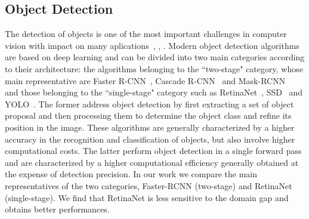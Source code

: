 \documentclass[preprint]{elsarticle}
\begin{document}
\subsection{Object Detection}
The detection of objects is one of the most important challenges in computer vision with impact on many aplications~\cite{6745491}, \cite{6248010}, \cite{Chen_2017}. Modern object detection algorithms are based on deep learning and can be divided into two main categories according to their architecture: the algorithms belonging to the ``two-stage" category, whose main representative are Faster R-CNN~\cite{DBLP:journals/corr/RenHG015}, Cascade R-CNN~\cite{Cai_2018} and Mask-RCNN~\cite{He_2017} and those belonging to the ``single-stage" category such as RetinaNet~\cite{DBLP:journals/corr/abs-1708-02002}, SSD~\cite{Liu_2016} and YOLO~\cite{7780460}. The former address object detection by first extracting a set of object proposal and then processing them to determine the object class and refine its position in the image. These algorithms are generally characterized by a higher accuracy in the recognition and classification of objects, but also involve higher computational costs. The latter perform object detection in a single forward pass and are characterized by a higher computational efficiency generally obtained at the expense of detection precision. In our work we compare the main representatives of the two categories, Faster-RCNN (two-stage) and RetinaNet (single-stage). We find that RetinaNet is less sensitive to the domain gap and obtains better performances.
\end{document}
